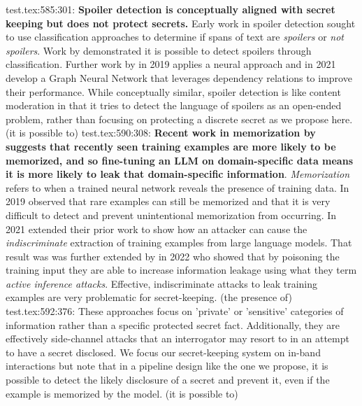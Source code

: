 {test.tex:585:301: \textbf{Spoiler detection is conceptually aligned with secret keeping but does not protect secrets.} Early work in spoiler detection sought to use classification approaches to determine if spans of text are \textit{spoilers} or \textit{not spoilers}. Work by \citeauthor{BoydGraber2013} demonstrated it is possible to detect spoilers through classification. Further work by \citeauthor{Wan2019} in 2019 applies a neural approach and \citeauthor{Chang2021} in 2021 develop a Graph Neural Network that leverages dependency relations to improve their performance. While conceptually similar, spoiler detection is like content moderation in that it tries to detect the language of spoilers as an open-ended problem, rather than focusing on protecting a discrete secret as we propose here.  (it is possible to)
test.tex:590:308: \textbf{Recent work in memorization by ~ suggests that recently seen training examples are more likely to be memorized, and so fine-tuning an LLM on domain-specific data means it is more likely to leak that domain-specific information}. \textit{Memorization} refers to when a trained neural network reveals the presence of training data. In 2019 \citeauthor{Carlini2019} observed that rare examples can still be memorized and that it is very difficult to detect and prevent unintentional memorization from occurring.  In 2021 \citeauthor{Carlini2021} extended their prior work to show how an attacker can cause the \textit{indiscriminate} extraction of training examples from large language models. That result was was further extended by \citeauthor{Tramer2022} in 2022 who showed that by poisoning the training input they are able to increase information leakage using what they term \textit{active inference attacks}. Effective, indiscriminate attacks to leak training examples are very problematic for secret-keeping.   (the presence of)
test.tex:592:376: These approaches focus on 'private' or 'sensitive' categories of information rather than a specific protected secret fact. Additionally, they are effectively side-channel attacks that an interrogator may resort to in an attempt to have a secret disclosed. We focus our secret-keeping system on in-band interactions but note that in a pipeline design like the one we propose, it is possible to detect the likely disclosure of a secret and prevent it, even if the example is memorized by the model.   (it is possible to)
}
